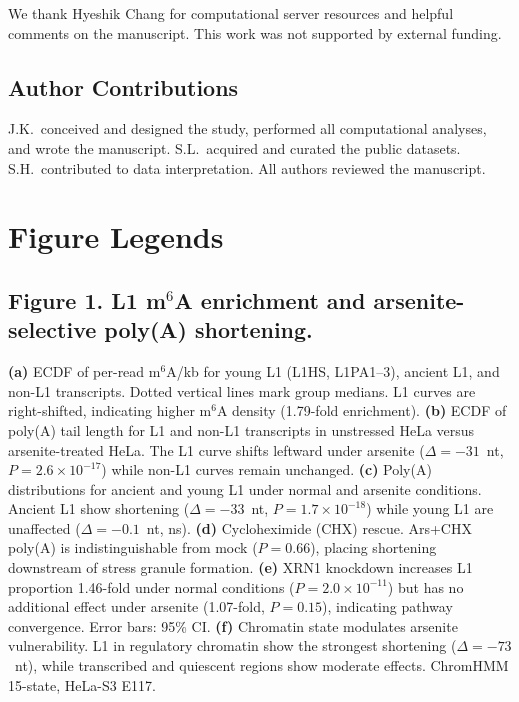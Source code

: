\documentclass[11pt]{article}
\newcommand{\msix}{m$^6$A}
\begin{document}
We thank Hyeshik Chang for computational server resources and helpful
comments on the manuscript. This work was not supported by external
funding.

\subsection*{Author Contributions}
J.K.\ conceived and designed the study, performed all computational
analyses, and wrote the manuscript. S.L.\ acquired and curated the
public datasets. S.H.\ contributed to data interpretation. All authors
reviewed the manuscript.



\clearpage
\section*{Figure Legends}

\subsection*{Figure 1. L1 \msix{} enrichment and arsenite-selective poly(A) shortening.}

\textbf{(a)} ECDF of per-read \msix{}/kb for young L1 (L1HS,
L1PA1--3), ancient L1, and non-L1 transcripts. Dotted vertical lines
mark group medians. L1 curves are right-shifted, indicating higher
\msix{} density (1.79-fold enrichment).
%
\textbf{(b)} ECDF of poly(A) tail length for L1 and non-L1 transcripts
in unstressed HeLa versus arsenite-treated HeLa. The L1 curve shifts
leftward under arsenite ($\Delta = -31$~nt, $P = 2.6 \times 10^{-17}$)
while non-L1 curves remain unchanged.
%
\textbf{(c)} Poly(A) distributions for ancient and young L1 under
normal and arsenite conditions. Ancient L1 show shortening
($\Delta = -33$~nt, $P = 1.7 \times 10^{-18}$) while young L1 are
unaffected ($\Delta = -0.1$~nt, ns).
%
\textbf{(d)} Cycloheximide (CHX) rescue. Ars+CHX poly(A) is
indistinguishable from mock ($P = 0.66$), placing shortening downstream
of stress granule formation.
%
\textbf{(e)} XRN1 knockdown increases L1 proportion 1.46-fold under
normal conditions ($P = 2.0 \times 10^{-11}$) but has no additional
effect under arsenite (1.07-fold, $P = 0.15$), indicating pathway
convergence. Error bars: 95\% CI.
%
\textbf{(f)} Chromatin state modulates arsenite vulnerability. L1 in
regulatory chromatin show the strongest shortening ($\Delta = -73$~nt),
while transcribed and quiescent regions show moderate effects.
ChromHMM 15-state, HeLa-S3 E117.
\end{document}
